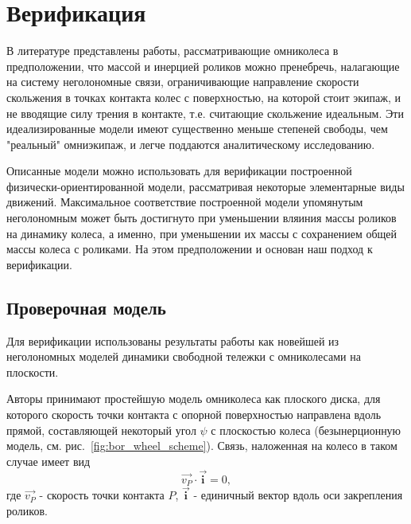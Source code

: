 \section{Верификация}
В литературе представлены \cite{Borisov2011, formalskii, ZobovaTatarinovPMM} работы, рассматривающие омниколеса в предположении, что массой и инерцией роликов можно пренебречь, налагающие на систему неголономные связи, ограничивающие направление скорости скольжения в точках контакта колес с поверхностью, на которой стоит экипаж, и не вводящие силу трения в контакте, т.е. считающие скольжение идеальным. Эти идеализированные модели имеют существенно меньше степеней свободы, чем "реальный" омниэкипаж, и легче поддаются аналитическому исследованию.

Описанные модели можно использовать для верификации построенной физически-ориентированной модели, рассматривая некоторые элементарные виды движений. Максимальное соответствие построенной модели упомянутым неголономным может быть достигнуто при уменьшении вляиния массы роликов на динамику колеса, а именно, при уменьшении их массы с сохранением общей массы колеса с роликами. На этом предположении и основан наш подход к верификации.

\subsection{Проверочная модель}

Для верификации использованы результаты работы \cite{Borisov2011} как новейшей из неголономных моделей динамики свободной тележки с омниколесами на плоскости.

Авторы \cite{Borisov2011} принимают простейшую модель омниколеса как плоского диска, для которого скорость точки контакта с опорной поверхностью направлена вдоль прямой, составляющей некоторый угол $\psi$ с плоскостью колеса (безынерционную модель, см. рис.~\ref{fig:bor_wheel_scheme}). Связь, наложенная на колесо в таком случае имеет вид
$$\vec{v_P}\cdot\vec{\mathbf{i}} = 0,$$
где $\vec{v_P}$ - скорость точки контакта $P$, $\vec{\mathbf{i}}$ - единичный вектор вдоль оси закрепления роликов.\\

